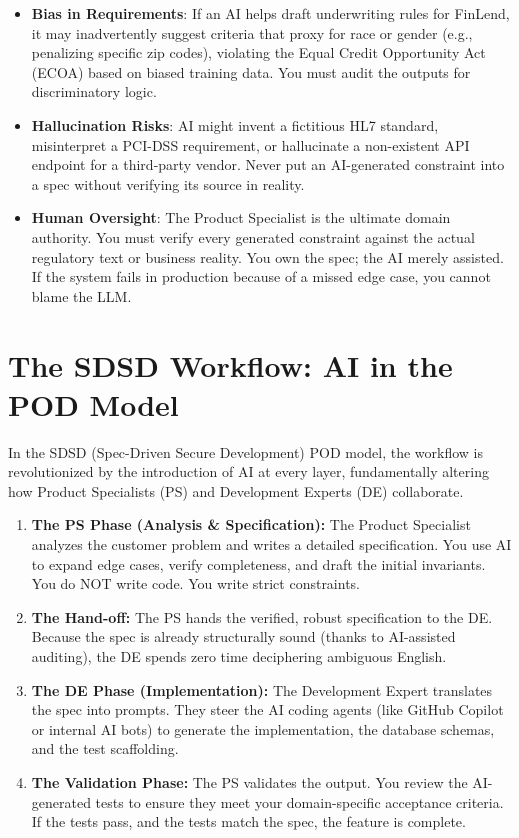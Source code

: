 \documentclass[
  11pt,
  openany,
  oneside]{book}
\providecommand{\tightlist}{%
  \setlength{\itemsep}{0pt}\setlength{\parskip}{0pt}}
\begin{document}
\begin{itemize}
\tightlist
\item
  \textbf{Bias in Requirements}: If an AI helps draft underwriting rules
  for FinLend, it may inadvertently suggest criteria that proxy for race
  or gender (e.g., penalizing specific zip codes), violating the Equal
  Credit Opportunity Act (ECOA) based on biased training data. You must
  audit the outputs for discriminatory logic.
\item
  \textbf{Hallucination Risks}: AI might invent a fictitious HL7
  standard, misinterpret a PCI-DSS requirement, or hallucinate a
  non-existent API endpoint for a third-party vendor. Never put an
  AI-generated constraint into a spec without verifying its source in
  reality.
\item
  \textbf{Human Oversight}: The Product Specialist is the ultimate
  domain authority. You must verify every generated constraint against
  the actual regulatory text or business reality. You own the spec; the
  AI merely assisted. If the system fails in production because of a
  missed edge case, you cannot blame the LLM.
\end{itemize}

\section{The SDSD Workflow: AI in the POD
Model}\label{the-sdsd-workflow-ai-in-the-pod-model}

In the SDSD (Spec-Driven Secure Development) POD model, the workflow is
revolutionized by the introduction of AI at every layer, fundamentally
altering how Product Specialists (PS) and Development Experts (DE)
collaborate.

\begin{enumerate}
\def\labelenumi{\arabic{enumi}.}
\tightlist
\item
  \textbf{The PS Phase (Analysis \& Specification):} The Product
  Specialist analyzes the customer problem and writes a detailed
  specification. You use AI to expand edge cases, verify completeness,
  and draft the initial invariants. You do NOT write code. You write
  strict constraints.
\item
  \textbf{The Hand-off:} The PS hands the verified, robust specification
  to the DE. Because the spec is already structurally sound (thanks to
  AI-assisted auditing), the DE spends zero time deciphering ambiguous
  English.
\item
  \textbf{The DE Phase (Implementation):} The Development Expert
  translates the spec into prompts. They steer the AI coding agents
  (like GitHub Copilot or internal AI bots) to generate the
  implementation, the database schemas, and the test scaffolding.
\item
  \textbf{The Validation Phase:} The PS validates the output. You review
  the AI-generated tests to ensure they meet your domain-specific
  acceptance criteria. If the tests pass, and the tests match the spec,
  the feature is complete.
\end{enumerate}
\end{document}

